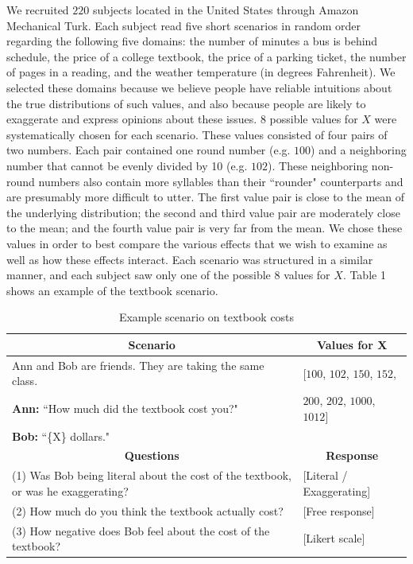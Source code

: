 \documentclass{article} %
\begin{document}
We recruited $220$ subjects located in the United States through Amazon Mechanical Turk. Each subject read five short scenarios in random order regarding the following five domains: the number of minutes a bus is behind schedule, the price of a college textbook, the price of a parking ticket, the number of pages in a reading, and the weather temperature (in degrees Fahrenheit). We selected these domains because we believe people have reliable intuitions about the true distributions of such values, and also because people are likely to exaggerate and express opinions about these issues. $8$ possible values for $X$ were systematically chosen for each scenario. These values consisted of four pairs of two numbers. Each pair contained one round number (e.g. $100$) and a neighboring number that cannot be evenly divided by 10 (e.g. $102$). These neighboring non-round numbers also contain more syllables than their ``rounder" counterparts and are presumably more difficult to utter. The first value pair is close to the mean of the underlying distribution; the second and third value pair are moderately close to the mean; and the fourth value pair is very far from the mean. We chose these values in order to best compare the various effects that we wish to examine as well as how these effects interact. Each scenario was structured in a similar manner, and each subject saw only one of the possible $8$ values for $X$. Table 1 shows an example of the textbook scenario.
\begin{table}[h]
\begin{tabular}{| p{9.7cm}| l |}\hline
\multicolumn{1}{|c|}{\textbf{Scenario}} & \multicolumn{1}{|c|}{\textbf{Values for X}} \\\hline
\multicolumn{1}{|l|}{Ann and Bob are friends. They are taking the same class.} & \multicolumn{1}{|l|}{[$100$, $102$, $150$, $152$,}\\
\multicolumn{1}{|l|}{\textbf{Ann:} ``How much did the textbook cost you?"} & \multicolumn{1}{|l|}{$200$, $202$, $1000$, $1012$]}\\
\multicolumn{1}{|l|}{\textbf{Bob:} ``\{X\} dollars."} & \multicolumn{1}{|l|}{}\\\hline
\multicolumn{1}{|c|}{\textbf{Questions}} & \multicolumn{1}{|c|}{\textbf{Response}} \\\hline
(1) Was Bob being literal about the cost of the textbook, or was he exaggerating? & [Literal / Exaggerating] \\
(2) How much do you think the textbook actually cost? & [Free response] \\
(3) How negative does Bob feel about the cost of the textbook? & [Likert scale]\\\hline
\end{tabular}
\caption{Example scenario on textbook costs}
\label{tab:myfirsttable}
\end{table}
\end{document}

